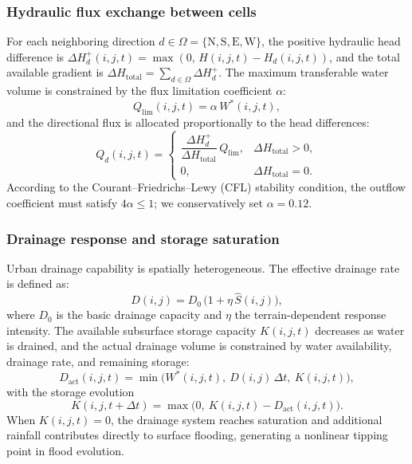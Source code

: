 \documentclass[preprint,12pt]{elsarticle}
\begin{document}
\subsubsection{Hydraulic flux exchange between cells}
For each neighboring direction $d \in \Omega = \{\mathrm{N,S,E,W}\}$, the
positive hydraulic head difference is
$\Delta H_d^{+}(i,j,t) = \max(0,\, H(i,j,t) - H_d(i,j,t))$, and the total
available gradient is $\Delta H_{\mathrm{total}} =
\sum_{d\in\Omega}\Delta H_d^{+}$. The maximum transferable water volume is
constrained by the flux limitation coefficient $\alpha$:
\begin{equation}\label{eq:qlim}
Q_{\mathrm{lim}}(i,j,t) = \alpha\, W^{*}(i,j,t),
\end{equation}
and the directional flux is allocated proportionally to the head differences:
\begin{equation}\label{eq:qdir}
Q_d(i,j,t) =
\begin{cases}
\dfrac{\Delta H_d^{+}}{\Delta H_{\mathrm{total}}}\, Q_{\mathrm{lim}},
& \Delta H_{\mathrm{total}} > 0,\\[4pt]
0, & \Delta H_{\mathrm{total}} = 0.
\end{cases}
\end{equation}
According to the Courant--Friedrichs--Lewy (CFL) stability condition, the
outflow coefficient must satisfy $4\alpha \le 1$; we conservatively set
$\alpha = 0.12$.

\subsubsection{Drainage response and storage saturation}
Urban drainage capability is spatially heterogeneous. The effective drainage
rate is defined as:
\begin{equation}\label{eq:drain}
D(i,j) = D_0\,\bigl(1 + \eta\,\hat{S}(i,j)\bigr),
\end{equation}
where $D_0$ is the basic drainage capacity and $\eta$ the terrain-dependent
response intensity. The available subsurface storage capacity $K(i,j,t)$
decreases as water is drained, and the actual drainage volume is constrained
by water availability, drainage rate, and remaining storage:
\begin{equation}\label{eq:dact}
D_{\mathrm{act}}(i,j,t) =
\min\!\bigl(W^{*}(i,j,t),\ D(i,j)\,\Delta t,\ K(i,j,t)\bigr),
\end{equation}
with the storage evolution
\begin{equation}\label{eq:storage}
K(i,j,t+\Delta t) = \max\!\bigl(0,\ K(i,j,t) - D_{\mathrm{act}}(i,j,t)\bigr).
\end{equation}
When $K(i,j,t)=0$, the drainage system reaches saturation and additional
rainfall contributes directly to surface flooding, generating a nonlinear
tipping point in flood evolution.
\end{document}
